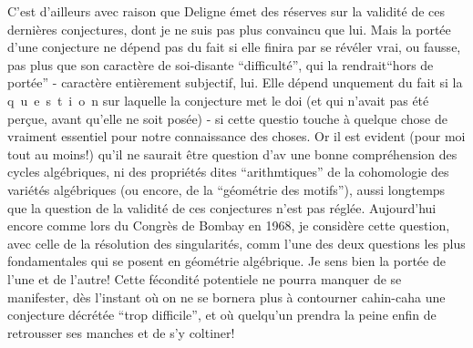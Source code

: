 C'est d'ailleurs avec raison que Deligne émet des réserves sur la validité de ces dernières conjectures, dont je ne suis pas plus convaincu que lui. Mais la portée d'une conjecture ne dépend pas du fait si elle finira par se révéler vrai, ou fausse, pas plus que son caractère de soi-disante ``difficulté'', qui la rendrait``hors de portée'' - caractère entièrement subjectif, lui. Elle dépend unquement du fait si la \mbox{q u e s t i o n} sur laquelle la conjecture met le doi (et qui n'avait pas été perçue, avant qu'elle ne soit posée) - si cette questio touche à quelque chose de vraiment essentiel pour notre connaissance des choses. Or il est evident (pour moi tout au moins!) qu'il ne saurait être question d'av une bonne compréhension des cycles algébriques, ni des propriétés dites ``arithmtiques'' de la cohomologie des variétés algébriques (ou encore, de la ``géométrie des motifs''), aussi longtemps que la question de la validité de ces conjectures n'est pas réglée. Aujourd'hui encore comme lors du Congrès de Bombay en 1968, je considère cette question, avec celle de la résolution des singularités, comm l'une des deux questions les plus fondamentales qui se posent en géométrie algébrique. Je sens bien la portée de l'une et de l'autre! Cette fécondité potentiele ne pourra manquer de se manifester, dès l'instant où on ne se bornera plus à contourner cahin-caha une conjecture décrétée ``trop difficile'', et où quelqu'un prendra la peine enfin de retrousser ses manches et de s'y coltiner!

